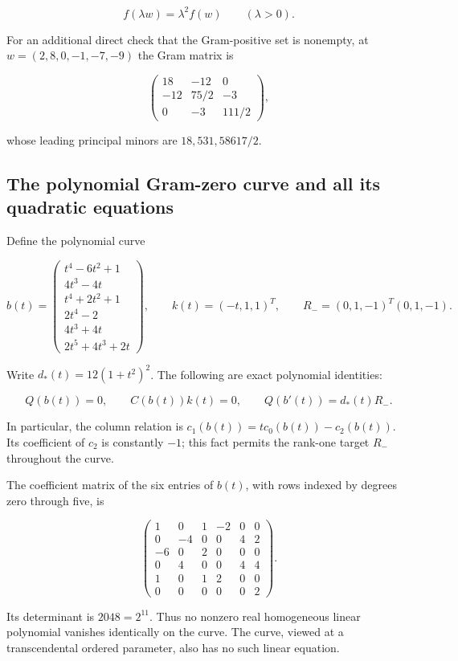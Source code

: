 \documentclass[11pt]{article}
\begin{document}
\[
f(\lambda w)=\lambda^2 f(w)\qquad(\lambda>0).
\tag{10}
\]

For an additional direct check that the Gram-positive set is nonempty, at
\(w=(2,8,0,-1,-7,-9)\) the Gram matrix is

\[
\begin{pmatrix}18&-12&0\\-12&75/2&-3\\0&-3&111/2\end{pmatrix},
\]

whose leading principal minors are \(18,531,58617/2\).

\subsection{The polynomial Gram-zero curve and all its quadratic equations}

Define the polynomial curve

\[
b(t)=\begin{pmatrix}
t^4-6t^2+1\\
4t^3-4t\\
t^4+2t^2+1\\
2t^4-2\\
4t^3+4t\\
2t^5+4t^3+2t
\end{pmatrix},
\qquad k(t)=(-t,1,1)^T,
\qquad
R_-=(0,1,-1)^T(0,1,-1).
\tag{11}
\]

Write \(d_*(t)=12(1+t^2)^2\). The following are exact polynomial identities:

\[
Q(b(t))=0,\qquad C(b(t))k(t)=0,\qquad
Q(b'(t))=d_*(t)R_-.
\tag{12}
\]

In particular, the column relation is
\(c_1(b(t))=t c_0(b(t))-c_2(b(t))\). Its coefficient of \(c_2\) is
constantly \(-1\); this fact permits the rank-one target \(R_-\) throughout
the curve.

The coefficient matrix of the six entries of \(b(t)\), with rows indexed by
degrees zero through five, is

\[
\begin{pmatrix}
1&0&1&-2&0&0\\
0&-4&0&0&4&2\\
-6&0&2&0&0&0\\
0&4&0&0&4&4\\
1&0&1&2&0&0\\
0&0&0&0&0&2
\end{pmatrix}.
\tag{13}
\]

Its determinant is \(2048=2^{11}\). Thus no nonzero real homogeneous
linear polynomial vanishes identically on the curve. The curve, viewed at a
transcendental ordered parameter, also has no such linear equation.
\end{document}
